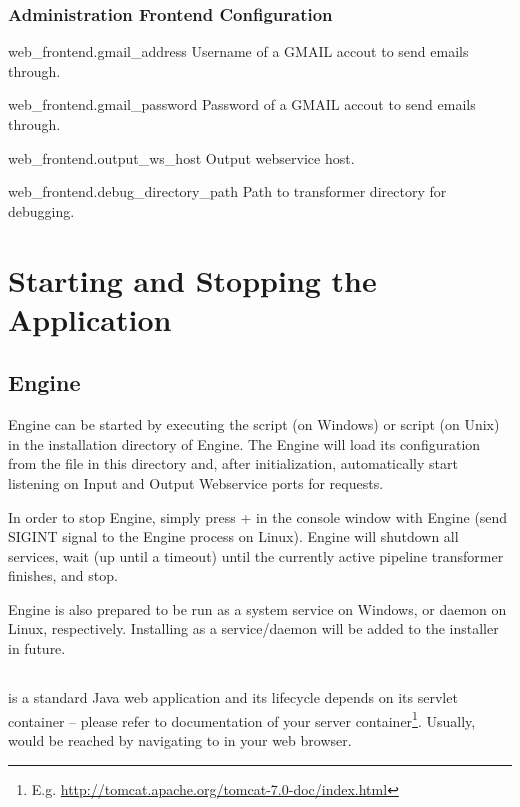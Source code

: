 \subsection*{Administration Frontend Configuration}
\begin{configlist}
	
	\item[web\_frontend.gmail\_address]
		Username of a GMAIL accout to send emails through.
		
	\item[web\_frontend.gmail\_password]
		Password of a GMAIL accout to send emails through.
		
	\item[web\_frontend.output\_ws\_host]
		Output webservice host.
		
	\item[web\_frontend.debug\_directory\_path]
		Path to transformer directory for debugging.
\end{configlist}


\chapter{Starting and Stopping the Application}
\section{Engine}
\odcs Engine can be started by executing the  script (on Windows) or  script (on Unix) in the installation directory of \odcs Engine. The Engine will load its configuration from the  file in this directory and, after initialization, automatically start listening on Input and Output Webservice ports for requests.

In order to stop Engine, simply press + in the console window with Engine (send SIGINT signal to the Engine process on Linux). Engine will shutdown all services, wait (up until a timeout) until the currently active pipeline transformer finishes, and stop.

Engine is also prepared to be run as a system service on Windows, or daemon on Linux, respectively. Installing \odcs as a service/daemon will be added to the installer in future.

\section{\FE}
\FE is a standard Java web application and its lifecycle depends on its servlet container -- please refer to documentation of your server container\footnote{E.g. \url{http://tomcat.apache.org/tomcat-7.0-doc/index.html}}. Usually, \FE would be reached by navigating to  in your web browser.

